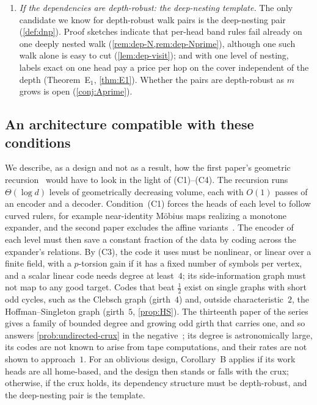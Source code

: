\begin{enumerate}[label=(C\arabic*),leftmargin=3em]
that our results exclude are listed in \cref{sec:con-fail}.
Over a finite field, with a fixed number of symbols per vertex, a gain must come from $p$-torsion (\cref{cor:torsion}).
The binary code of rate $5/8$ on the Clebsch graph (\cref{cor:H4}) is not a torsion effect: it is the reduction of a rational
eigenvalue code with coefficients~$1$ (\cref{rem:ana-clebsch}), a mechanism that \cref{cor:torsion} rules out on locally
bipartite families of bounded degree. In odd
characteristic at most one of the two signed versions $I\pm W$ of a code can gain (\cref{prop:oddchar}).
\item \emph{If the dependencies are depth-robust: the deep-nesting template.} The only candidate we know for depth-robust walk pairs is
the deep-nesting pair (\cref{def:dnp}). Proof sketches indicate that per-head band rules fail already on one deeply nested walk
(\cref{rem:dep-N,rem:dep-Nprime}), although one such walk alone is easy to cut (\cref{lem:dep-visit}); and with one level
of nesting, labels exact on one head pay a price per hop on the cover independent of the depth (Theorem~E$_1$,
\cref{thm:E1}). Whether the pairs are depth-robust as $m$ grows is open (\cref{conj:Aprime}).
\end{enumerate}

\subsection{An architecture compatible with these conditions}

We describe, as a design and not as a result, how the first paper's geometric recursion~\cite[\S13]{FirstPaper2026} would
have to look in the light of (C1)--(C4). The recursion runs $\Theta(\log d)$ levels of geometrically decreasing volume,
each with $O(1)$ passes of an encoder and a decoder. Condition~(C1) forces the heads of each level to follow curved
rulers, for example near-identity Möbius maps realizing a monotone expander, and the second paper excludes the affine
variants~\cite{SecondPaper2026}. The encoder of each level must then save a constant fraction of the data by coding across
the expander's relations. By (C3), the code it uses must be nonlinear, or linear over a finite field,
with a $p$-torsion gain if it has a fixed number of symbols per vertex, and
a scalar linear code needs degree at least~$4$; its side-information graph must not map to any good target. Codes that beat $\tfrac12$ exist on single graphs with short
odd cycles, such as the Clebsch graph (girth~$4$) and, outside characteristic~$2$, the Hoffman--Singleton graph
(girth~$5$, \cref{prop:HS}). The thirteenth paper of the series gives a family of bounded degree and growing odd girth
that carries one, and so answers \cref{prob:undirected-crux} in the negative~\cite[Corollary~U]{StorageCodes2026}; its
degree is astronomically large, its codes are not known to arise from tape computations, and their rates are not shown
to approach~$1$. For an oblivious design, Corollary~B applies if its
work heads are all home-based, and the design then stands or falls with the crux; otherwise, if the crux holds, its
dependency structure must be depth-robust, and the deep-nesting pair is the template.

